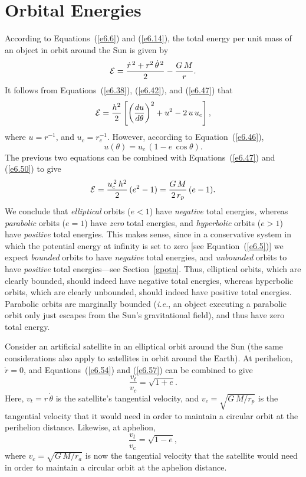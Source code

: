 \section{Orbital Energies}
According to Equations~(\ref{e6.6}) and (\ref{e6.14}), the total energy per unit mass
of an object in orbit around the Sun is
given by
\begin{equation}\label{e6.54}
{\cal E} = \frac {\dot{r}^{\,2} + r^2\,\dot{\theta}^{\,2}}{2} - \frac{G\,M}{r}.
\end{equation}
It follows from Equations~(\ref{e6.38}), (\ref{e6.42}), and (\ref{e6.47}) that
\begin{equation}\label{e6.55}
{\cal E} = \frac{h^2}{2}\left[\left(\frac{du}{d\theta}\right)^2
+ u^2 - 2\,u\,u_c\right],
\end{equation}
where $u=r^{-1}$, and $u_c = r_c^{-1}$. However, according to Equation~(\ref{e6.46}),
\begin{equation}
u(\theta) = u_c\,(1-e\,\cos\theta).
\end{equation}
The previous two equations can be combined with Equations~(\ref{e6.47})
and (\ref{e6.50}) to give
\begin{equation}\label{e6.57}
{\cal E} = \frac{u_c^{\,2}\,h^2}{2}\, (e^2 -1) = \frac{G\,M}{2\,r_p}\,(e-1).
\end{equation}
We conclude that {\em elliptical}\/ orbits ($e<1$) have {\em negative}\/ total energies,
whereas {\em parabolic}\/ orbits ($e=1$) have {\em zero}\/ total energies,
and {\em hyperbolic}\/ orbits ($e>1$) have {\em positive}\/ total energies. This
makes sense, since in a conservative system in which the potential
energy at infinity is set to zero [see Equation~(\ref{e6.5})] we expect {\em bounded}\/ orbits to have {\em negative}\/ total energies, and {\em unbounded}\/ orbits to have {\em positive}\/
total energies---see Section~\ref{gpotn}. Thus, elliptical orbits, which are clearly bounded, should indeed have
negative total energies, whereas hyperbolic orbits, which are clearly
unbounded, should indeed have positive total energies. Parabolic orbits
are marginally bounded ({\em i.e.}, an object executing a parabolic orbit only just escapes from the Sun's gravitational field), and thus have zero total energy.

Consider an artificial satellite in an elliptical orbit around the
Sun (the same considerations also apply to satellites in orbit around the Earth). At perihelion, $\dot{r}=0$, and Equations~(\ref{e6.54}) and (\ref{e6.57})
can be combined to give
\begin{equation}\label{e6.57a}
\frac{v_t}{v_c} = \sqrt{1+e}.
\end{equation}
Here, $v_t=r\,\dot{\theta}$ is the satellite's tangential velocity, and
$v_c=\sqrt{G\,M/r_p}$ is the tangential velocity that it would need in order to
maintain a circular orbit at the perihelion distance. 
Likewise, at aphelion,
\begin{equation}\label{e6.57b}
\frac{v_t}{v_c} = \sqrt{1-e},
\end{equation}
where $v_c=\sqrt{G\,M/r_a}$ is now the tangential velocity that the
satellite would need in order to maintain a circular orbit at the aphelion distance.

